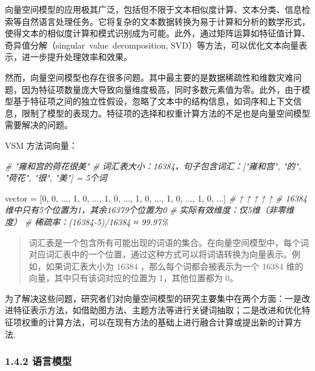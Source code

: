 \documentclass[
]{article}
\newenvironment{Shaded}{}{}
\newcommand{\CommentTok}[1]{\textcolor[rgb]{0.38,0.63,0.69}{\textit{#1}}}
\newcommand{\DecValTok}[1]{\textcolor[rgb]{0.25,0.63,0.44}{#1}}
\newcommand{\NormalTok}[1]{#1}
\newcommand{\OperatorTok}[1]{\textcolor[rgb]{0.40,0.40,0.40}{#1}}
\begin{document}
向量空间模型的应用极其广泛，包括但不限于文本相似度计算、文本分类、信息检索等自然语言处理任务。它将复杂的文本数据转换为易于计算和分析的数学形式，使得文本的相似度计算和模式识别成为可能。此外，通过矩阵运算如特征值计算、奇异值分解（singular~value~decomposition,
SVD）等方法，可以优化文本向量表示，进一步提升处理效率和效果。

然而，向量空间模型也存在很多问题。其中最主要的是数据稀疏性和维数灾难问题，因为特征项数量庞大导致向量维度极高，同时多数元素值为零。此外，由于模型基于特征项之间的独立性假设，忽略了文本中的结构信息，如词序和上下文信息，限制了模型的表现力。特征项的选择和权重计算方法的不足也是向量空间模型需要解决的问题。

VSM 方法词向量：

\begin{Shaded}
\begin{Highlighting}[]
\CommentTok{\# "雍和宫的荷花很美"}
\CommentTok{\# 词汇表大小：16384，句子包含词汇：["雍和宫", "的", "荷花", "很", "美"] = 5个词}

\NormalTok{vector }\OperatorTok{=}\NormalTok{ [}\DecValTok{0}\NormalTok{, }\DecValTok{0}\NormalTok{, ..., }\DecValTok{1}\NormalTok{, }\DecValTok{0}\NormalTok{, ..., }\DecValTok{1}\NormalTok{, }\DecValTok{0}\NormalTok{, ..., }\DecValTok{1}\NormalTok{, }\DecValTok{0}\NormalTok{, ..., }\DecValTok{1}\NormalTok{, }\DecValTok{0}\NormalTok{, ..., }\DecValTok{1}\NormalTok{, }\DecValTok{0}\NormalTok{, ...]}
\CommentTok{\#                    ↑          ↑          ↑          ↑          ↑}
\CommentTok{\#      16384维中只有5个位置为1，其余16379个位置为0}
\CommentTok{\# 实际有效维度：仅5维（非零维度）}
\CommentTok{\# 稀疏率：(16384{-}5)/16384 ≈ 99.97\%}
\end{Highlighting}
\end{Shaded}

\begin{quote}
词汇表是一个包含所有可能出现的词语的集合。在向量空间模型中，每个词对应词汇表中的一个位置，通过这种方式可以将词语转换为向量表示。例如，如果词汇表大小为
16384 ，那么每个词都会被表示为一个 16384
维的向量，其中只有该词对应的位置为 1，其他位置都为 0。
\end{quote}

为了解决这些问题，研究者们对向量空间模型的研究主要集中在两个方面：一是改进特征表示方法，如借助图方法、主题方法等进行关键词抽取；二是改进和优化特征项权重的计算方法，可以在现有方法的基础上进行融合计算或提出新的计算方法.

\subsubsection{1.4.2 语言模型}\label{ux8bedux8a00ux6a21ux578b}
\end{document}
